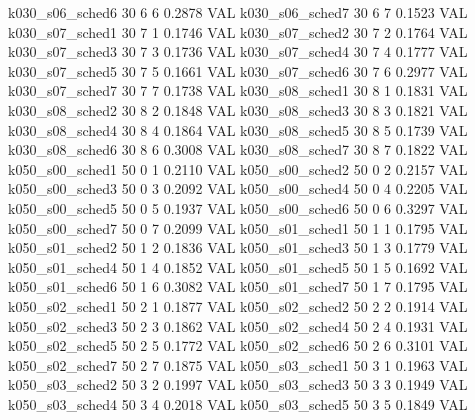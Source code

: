   k030_s06_sched6                   30    6   6    0.2878  VAL
  k030_s06_sched7                   30    6   7    0.1523  VAL
  k030_s07_sched1                   30    7   1    0.1746  VAL
  k030_s07_sched2                   30    7   2    0.1764  VAL
  k030_s07_sched3                   30    7   3    0.1736  VAL
  k030_s07_sched4                   30    7   4    0.1777  VAL
  k030_s07_sched5                   30    7   5    0.1661  VAL
  k030_s07_sched6                   30    7   6    0.2977  VAL
  k030_s07_sched7                   30    7   7    0.1738  VAL
  k030_s08_sched1                   30    8   1    0.1831  VAL
  k030_s08_sched2                   30    8   2    0.1848  VAL
  k030_s08_sched3                   30    8   3    0.1821  VAL
  k030_s08_sched4                   30    8   4    0.1864  VAL
  k030_s08_sched5                   30    8   5    0.1739  VAL
  k030_s08_sched6                   30    8   6    0.3008  VAL
  k030_s08_sched7                   30    8   7    0.1822  VAL
  k050_s00_sched1                   50    0   1    0.2110  VAL
  k050_s00_sched2                   50    0   2    0.2157  VAL
  k050_s00_sched3                   50    0   3    0.2092  VAL
  k050_s00_sched4                   50    0   4    0.2205  VAL
  k050_s00_sched5                   50    0   5    0.1937  VAL
  k050_s00_sched6                   50    0   6    0.3297  VAL
  k050_s00_sched7                   50    0   7    0.2099  VAL
  k050_s01_sched1                   50    1   1    0.1795  VAL
  k050_s01_sched2                   50    1   2    0.1836  VAL
  k050_s01_sched3                   50    1   3    0.1779  VAL
  k050_s01_sched4                   50    1   4    0.1852  VAL
  k050_s01_sched5                   50    1   5    0.1692  VAL
  k050_s01_sched6                   50    1   6    0.3082  VAL
  k050_s01_sched7                   50    1   7    0.1795  VAL
  k050_s02_sched1                   50    2   1    0.1877  VAL
  k050_s02_sched2                   50    2   2    0.1914  VAL
  k050_s02_sched3                   50    2   3    0.1862  VAL
  k050_s02_sched4                   50    2   4    0.1931  VAL
  k050_s02_sched5                   50    2   5    0.1772  VAL
  k050_s02_sched6                   50    2   6    0.3101  VAL
  k050_s02_sched7                   50    2   7    0.1875  VAL
  k050_s03_sched1                   50    3   1    0.1963  VAL
  k050_s03_sched2                   50    3   2    0.1997  VAL
  k050_s03_sched3                   50    3   3    0.1949  VAL
  k050_s03_sched4                   50    3   4    0.2018  VAL
  k050_s03_sched5                   50    3   5    0.1849  VAL
